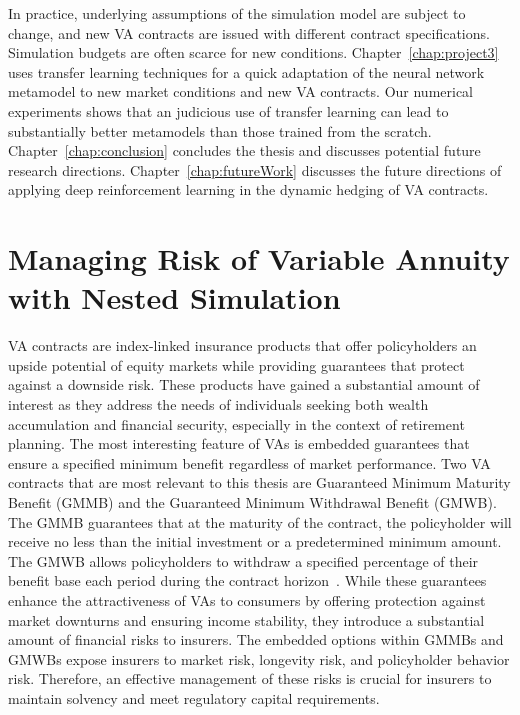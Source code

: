 In practice, underlying assumptions of the simulation model are subject to change, and new VA contracts are issued with different contract specifications.
Simulation budgets are often scarce for new conditions.
Chapter~\ref{chap:project3} uses transfer learning techniques for a quick adaptation of the neural network metamodel to new market conditions and new VA contracts.
Our numerical experiments shows that an judicious use of transfer learning can lead to substantially better metamodels than those trained from the scratch.
Chapter~\ref{chap:conclusion} concludes the thesis and discusses potential future research directions.
Chapter~\ref{chap:futureWork} discusses the future directions of applying deep reinforcement learning in the dynamic hedging of VA contracts.

\section{Managing Risk of Variable Annuity with Nested Simulation}

VA contracts are index-linked insurance products that offer policyholders an upside potential of equity markets while providing guarantees that protect against a downside risk.
These products have gained a substantial amount of interest as they address the needs of individuals seeking both wealth accumulation and financial security, especially in the context of retirement planning.
The most interesting feature of VAs is embedded guarantees that ensure a specified minimum benefit regardless of market performance.
Two VA contracts that are most relevant to this thesis are Guaranteed Minimum Maturity Benefit (GMMB) and the Guaranteed Minimum Withdrawal Benefit (GMWB). 
The GMMB guarantees that at the maturity of the contract, the policyholder will receive no less than the initial investment or a predetermined minimum amount. 
The GMWB allows policyholders to withdraw a specified percentage of their benefit base each period during the contract horizon~\citep{hardy2003investment}.
While these guarantees enhance the attractiveness of VAs to consumers by offering protection against market downturns and ensuring income stability, they introduce a substantial amount of financial risks to insurers. 
The embedded options within GMMBs and GMWBs expose insurers to market risk, longevity risk, and policyholder behavior risk. 
Therefore, an effective management of these risks is crucial for insurers to maintain solvency and meet regulatory capital requirements.

